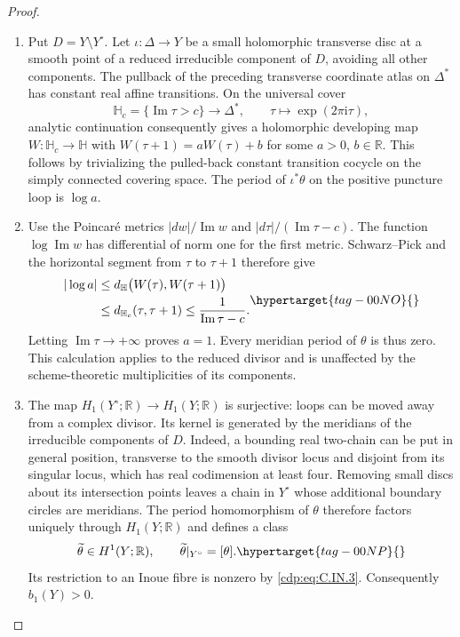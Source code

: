 \begin{proof}
\begin{enumerate}[leftmargin=*]
\item Put
$D=Y\setminus Y^\circ$. Let $\iota:\Delta\to Y$ be a small
holomorphic transverse disc at a smooth point of a reduced
irreducible component of $D$, avoiding all other components.
The pullback of the preceding transverse coordinate atlas on
$\Delta^*$ has constant real affine transitions. On the universal
cover
\[
 \mathbb H_c=\{\operatorname{Im}\tau>c\}
 \longrightarrow\Delta^*,\qquad
 \tau\longmapsto\exp(2\pi\mathrm i\tau),
\]
analytic continuation consequently gives a holomorphic developing
map $W:\mathbb H_c\to\mathbb H$ with
$W(\tau+1)=aW(\tau)+b$ for some $a>0$, $b\in\mathbb R$.
This follows by trivializing the pulled-back constant transition
cocycle on the simply connected covering space.
The period of $\iota^*\theta$ on the positive puncture loop is
$\log a$.

\item Use the Poincar\'e metrics
$|dw|/\operatorname{Im}w$ and
$|d\tau|/(\operatorname{Im}\tau-c)$.
The function $\log\operatorname{Im}w$ has differential of norm
one for the first metric. Schwarz--Pick and the horizontal segment
from $\tau$ to $\tau+1$ therefore give
\begin{equation}
\begin{aligned}
 |\log a|
 &\le d_{\mathbb H}\bigl(W(\tau),W(\tau+1)\bigr)\\
 &\le d_{\mathbb H_c}(\tau,\tau+1)
 \le\frac{1}{\operatorname{Im}\tau-c}.
\end{aligned}
\hypertarget{tag-00NO}{}\label{cdp:eq:C.IN.5}
\end{equation}
Letting $\operatorname{Im}\tau\to+\infty$ proves $a=1$.
Every meridian period of $\theta$ is thus zero. This calculation
applies to the reduced divisor and is unaffected by the
scheme-theoretic multiplicities of its components.

\item The map $H_1(Y^\circ;\mathbb R)\to H_1(Y;\mathbb R)$ is
surjective: loops can be moved away from a complex divisor.
Its kernel is generated by the meridians of the irreducible
components of $D$. Indeed, a bounding real two-chain can be put
in general position, transverse to the smooth divisor locus and
disjoint from its singular locus, which has real codimension at
least four. Removing small discs about its intersection points
leaves a chain in $Y^\circ$ whose additional boundary circles
are meridians. The period homomorphism of $\theta$ therefore factors uniquely
through $H_1(Y;\mathbb R)$ and defines a class
\begin{equation}
 \widetilde\theta\in H^1(Y;\mathbb R),\qquad
 \widetilde\theta|_{Y^\circ}=[\theta].
\hypertarget{tag-00NP}{}\label{cdp:eq:C.IN.6}
\end{equation}
Its restriction to an Inoue fibre is nonzero by \eqref{cdp:eq:C.IN.3}.
Consequently $b_1(Y)>0$.


\end{enumerate}
\end{proof}
